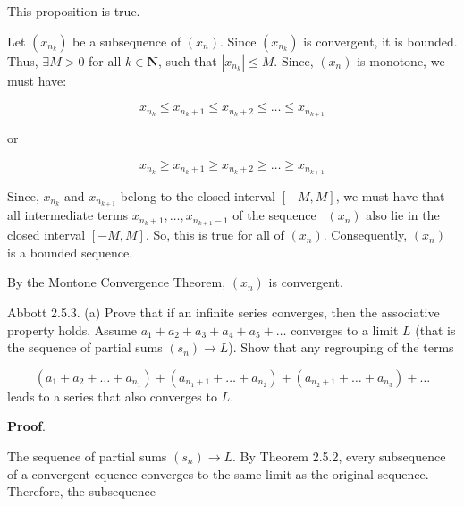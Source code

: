 \documentclass[10pt]{article}
\begin{document}
This proposition is true.



Let $\displaystyle ( x_{n_{k}})$ be a subsequence of $\displaystyle ( x_{n})$. Since $\displaystyle ( x_{n_{k}})$ is convergent, it is bounded. Thus, $\displaystyle \exists M >0$ for all $\displaystyle k\in \mathbf{N}$, such that $\displaystyle |x_{n_{k}} |\leq M$. Since, $\displaystyle ( x_{n})$ is monotone, we must have:


\begin{equation*}
x_{n_{k}} \leq x_{n_{k} +1} \leq x_{n_{k} +2} \leq \dotsc \leq x_{n_{k+1}}
\end{equation*}


or


\begin{equation*}
x_{n_{k}} \geq x_{n_{k} +1} \geq x_{n_{k} +2} \geq \dotsc \geq x_{n_{k+1}}
\end{equation*}


Since, $\displaystyle x_{n_{k}}$ and $\displaystyle x_{n_{k+1}}$ belong to the closed interval $\displaystyle [ -M,M]$, we must have that all intermediate terms $\displaystyle x_{n_{k} +1} ,\dotsc ,x_{n_{k+1} -1}$ of the sequence \ $\displaystyle ( x_{n})$ also lie in the closed interval $\displaystyle [ -M,M]$. So, this is true for all of $\displaystyle ( x_{n})$. Consequently, $\displaystyle ( x_{n})$ is a bounded sequence. 



By the Montone Convergence Theorem, $\displaystyle ( x_{n})$ is convergent.



Abbott 2.5.3. (a) Prove that if an infinite series converges, then the associative property holds. Assume $\displaystyle a_{1} +a_{2} +a_{3} +a_{4} +a_{5} +\dotsc $ converges to a limit $\displaystyle L$ (that is the sequence of partial sums $\displaystyle ( s_{n})\rightarrow L$). Show that any regrouping of the terms 




\begin{equation*}
( a_{1} +a_{2} +\dotsc +a_{n_{1}}) +( a_{n_{1} +1} +\dotsc +a_{n_{2}}) +( a_{n_{2} +1} +\dotsc +a_{n_{3}}) +\dotsc 
\end{equation*}
leads to a series that also converges to $\displaystyle L$.



\textbf{Proof}.



The sequence of partial sums $\displaystyle ( s_{n})\rightarrow L$. By Theorem 2.5.2, every subsequence of a convergent equence converges to the same limit as the original sequence. Therefore, the subsequence
\end{document}
